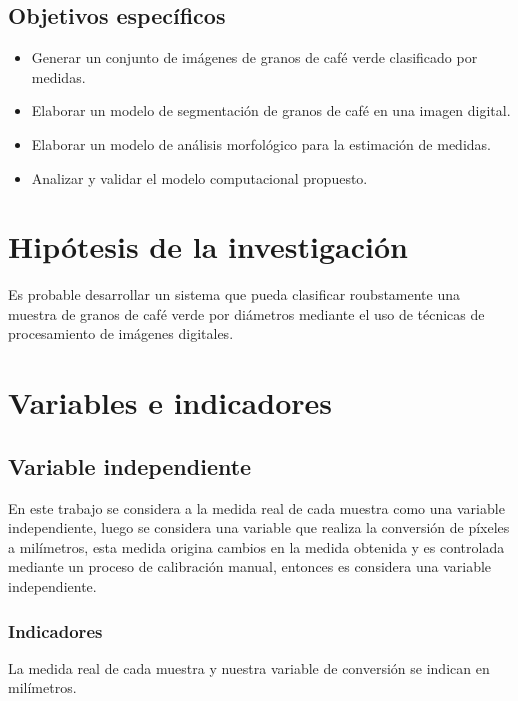\subsection{Objetivos específicos}
\begin{itemize}
	\item Generar un conjunto de imágenes de granos de café verde clasificado por medidas.
	\item Elaborar un modelo de segmentación de granos de café en una imagen digital.
	\item Elaborar un modelo de análisis morfológico para la estimación de medidas.
	\item Analizar y validar el modelo computacional propuesto.
\end{itemize}


\section{Hipótesis de la investigación}
Es probable desarrollar un sistema que pueda clasificar roubstamente una muestra de granos de café verde por diámetros mediante el uso de técnicas de procesamiento de imágenes digitales.


\section{Variables e indicadores}

\subsection{Variable independiente}
En este trabajo se considera a la medida real de cada muestra como una variable independiente, luego se considera una variable que realiza la conversión de píxeles a milímetros, esta medida origina cambios en la medida obtenida y es controlada mediante un proceso de calibración manual, entonces es considera una variable independiente.

\subsubsection{Indicadores}
La medida real de cada muestra y nuestra variable de conversión se indican en milímetros.

